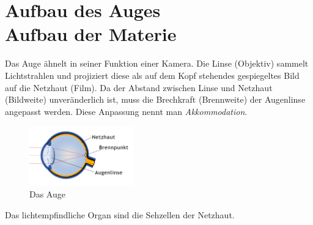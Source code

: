 \section[Aufbau des Auges\hfill Aufbau der Materie]{Aufbau des Auges\\{\normalsize Aufbau der Materie}}

Das Auge ähnelt in seiner Funktion einer Kamera. Die Linse (Objektiv) sammelt Lichtstrahlen und projiziert diese als auf dem Kopf stehendes gespiegeltes Bild auf die Netzhaut (Film). Da der Abstand zwischen Linse und Netzhaut (Bildweite) unveränderlich ist, muss die Brechkraft (Brennweite) der Augenlinse angepasst werden. Diese Anpassung nennt man \textit{Akkommodation}.

\begin{figure}
	\centering
	\includegraphics[width=4.5cm]{images/auge.png}
	\caption{Das Auge \cite{auge}}
\end{figure}

Das lichtempfindliche Organ sind die Sehzellen der Netzhaut.